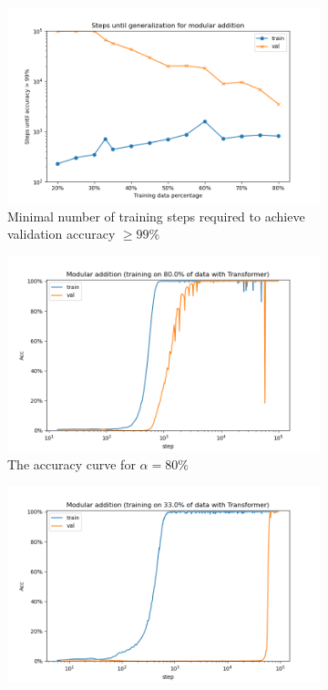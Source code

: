 \begin{figure}[!ht]
    \centering
    \begin{subfigure}[t]{0.3\textwidth}
        \includegraphics[width=\linewidth]{fig/Transformer_alpha/Transformer_alpha.png}
        \caption{Minimal number of training steps required to achieve validation accuracy $\geq 99\%$}
        \label{fig:transformer_alpha}
    \end{subfigure}
    \hfill %
    \begin{subfigure}[t]{0.3\textwidth}
        \includegraphics[width=\linewidth]{fig/grokking_curves/addition_80.0_Transformer_step.png}
        \caption{The accuracy curve for $\alpha = 80\%$}
        \label{fig:grokking_alpha_80}
    \end{subfigure}
    \hfill %
    \begin{subfigure}[t]{0.3\textwidth}
        \includegraphics[width=\linewidth]{fig/grokking_curves/addition_33.0_Transformer_step.png}

\end{subfigure}
\end{figure}
